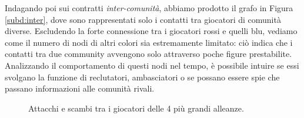 Indagando poi sui contratti \textit{inter-comunità}, abbiamo prodotto il grafo in Figura \ref{subd:inter}, dove sono rappresentati solo i contatti tra giocatori di comunità diverse. Escludendo la forte connessione tra i giocatori rossi e quelli blu, vediamo come il numero di nodi di altri colori sia estremamente limitato: ciò indica che i contatti tra due community avvengono solo attraverso poche figure prestabilite. Analizzando il comportamento di questi nodi nel tempo, è possibile intuire se essi svolgano la funzione di reclutatori, ambasciatori o se possano essere spie che passano informazioni alle comunità rivali. 
\begin{figure}
	\hfill
	\caption{Attacchi e scambi tra i giocatori delle 4 più grandi alleanze.}
	\label{fig:inter_att_tra}
\end{figure}

